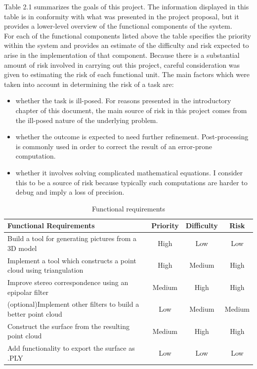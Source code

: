 \documentclass[12pt,a4paper,twoside,openright]{report}
\begin{document}
\begin{samepage}
Table 2.1 summarizes the goals of this project. The information displayed in this table is in conformity with what was presented in the project proposal, but it provides a lower-level overview of the functional components of the system.\\
For each of the functional components listed above the table specifies the priority within the system and provides an estimate of the difficulty and risk expected to arise in the implementation of that component. Because there is a substantial amount of risk involved in carrying out this project, careful consideration was given to estimating the risk of each functional unit. The main  factors which were taken into account in determining the risk of a task are:
\begin{itemize}
\item whether the task is ill-posed. For reasons presented in the introductory chapter of this document, the main source of risk in this project comes from the ill-posed nature of the underlying problem.
\item whether the outcome is expected to need further refinement. Post-processing is commonly used in order to correct the result of an error-prone computation.
\item whether it involves solving complicated mathematical equations. I consider this to be a source of risk because typically such computations are harder to debug and imply a loss of precision.
\end{itemize}     
\begin{center}
\begin{table}
\begin{tabularx}{\textwidth}{@{} Y c c c @{}} %
\toprule
\textbf{Functional Requirements} & \textbf{Priority} & \textbf{Difficulty} & \textbf{Risk}\\ \hline
\midrule
Build a tool for generating pictures from a 3D model                    &   High       &     Low      &   Low \\ \hline \addlinespace
Implement a tool which constructs a point cloud using triangulation   &   High       &     Medium      &   High \\ \hline \addlinespace
Improve stereo correspondence using an epipolar filter                  &   Medium       &     High      &   High \\ \hline \addlinespace
(optional)Implement other filters to build a better point cloud         &   Low       &     Medium      &   Medium \\ \hline \addlinespace
Construct the surface from the resulting point cloud                    &   Medium       &     High      &   High \\ \hline \addlinespace
Add functionality to export the surface as .PLY                         &   Low       &     Low      &   Low \\ 
\bottomrule
\end{tabularx}
\caption{Functional requirements} 
\label{table:nonlin}
\end{table}
\end{center}
\end{samepage}
\end{document}
